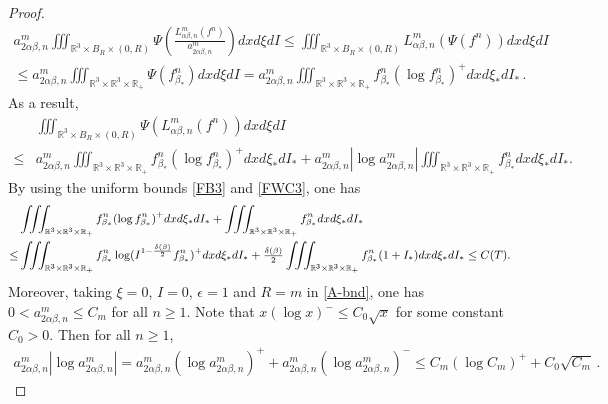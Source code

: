 \documentclass[reqno,11pt]{amsart}
\numberwithin{equation}{section}
\def\R{\mathbb{R}}
\begin{document}
\begin{proof}
\begin{equation*}
{\begin{aligned}
    a^m_{2\alpha \beta,n} \iiint_{\R^3 \times B_R\times(0,R)} \Psi (\tfrac{L^m_{ \alpha \beta ,n}(f^n)}{a^m_{2\alpha \beta,n}})dxd\xi dI \leq \iiint_{\R^3 \times B_R \times(0,R) } L^m_{ \alpha \beta ,n} (\Psi(f^n)) dxd\xi dI \\
    \leq a^m_{2\alpha \beta,n} \iiint_{\R^3 \times \R^3 \times \R_+ } \Psi(f^n_{\beta _*}) dxd\xi dI = a^m_{2\alpha \beta,n} \iiint_{\R^3 \times \R^3 \times \R_+} f^n_{\beta _*} (\log f^n_{\beta _*} )^+ dx d\xi_* dI_* \,.
  \end{aligned}}
\end{equation*}
As a result,
\begin{equation*}
  \begin{aligned}
    &\iiint_{\R^3 \times B_R\times(0,R)} \Psi (L^m_{ \alpha \beta ,n}(f^n))dxd\xi dI \\
    \leq & a^m_{2\alpha \beta,n} \iiint_{\R^3 \times \R^3 \times \R_+} f^n_{\beta _*} (\log f^n_{\beta _*} )^+ dx d\xi_* dI_* + a^m_{2\alpha \beta,n} |\log a^m_{2\alpha \beta,n}| \iiint_{\R^3 \times \R^3 \times \R_+} f^n_{\beta _*} dxd\xi_* dI_*.
  \end{aligned}
\end{equation*}
By using the uniform bounds \eqref{FB3} and \eqref{FWC3}, one has
	\begin{equation*}{\small
		\begin{aligned}
			&\iiint_{\R^3 \times \R^3 \times \R_+} f^n_{\beta _*} (\log f^n_{\beta _*} )^+ dx d\xi_* dI_* + \iiint_{\R^3 \times \R^3 \times \R_+} f^n_{\beta _*} dxd\xi_* dI_* \\
			\leq & \iiint_{\R^3 \times \R^3 \times \R_+} f^n_{\beta _*} \log (I^{1-\frac{\delta(\beta  )}{2}}f^n_{\beta _*} )^+ dxd\xi_* dI_* + \tfrac{\delta(\beta )}{2} \iiint_{\R^3 \times \R^3 \times \R_+} f^n_{\beta _*}(1+ I_*) dxd\xi_* dI_* \leq C(T).
		\end{aligned}}
	\end{equation*}
Moreover, taking $\xi = 0$, $I =0$, $\epsilon = 1$ and $R = m$ in \eqref{A-bnd}, one has $0 < a^m_{2 \alpha \beta, n} \leq C_m $ for all $n \geq 1$. Note that $x (\log x)^- \leq C_0 \sqrt{x}$ for some constant $C_0 > 0$. Then for all $n \geq 1$,
\begin{equation*}
  \begin{aligned}
    a^m_{2\alpha \beta,n} |\log a^m_{2\alpha \beta,n}| = a^m_{2\alpha \beta,n} ( \log a^m_{2\alpha \beta,n} )^+ + a^m_{2\alpha \beta,n} ( \log a^m_{2\alpha \beta,n} )^- \leq C_m (\log C_m)^+ + C_0 \sqrt{C_m} \,.
  \end{aligned}

\end{equation*}
\end{proof}
\end{document}
